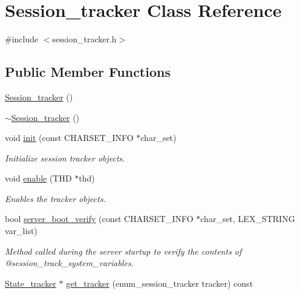 \hypertarget{classSession__tracker}{}\section{Session\+\_\+tracker Class Reference}
\label{classSession__tracker}


{\ttfamily \#include $<$session\+\_\+tracker.\+h$>$}

\subsection*{Public Member Functions}
\begin{DoxyCompactItemize}
\item 
\mbox{\hyperlink{classSession__tracker_a96857c2a4bb6477cdaba666a9cc571a2}{Session\+\_\+tracker}} ()
\item 
\mbox{\hyperlink{classSession__tracker_a1bf5d9cab3063c2a1b28e2535815ad6e}{$\sim$\+Session\+\_\+tracker}} ()
\item 
void \mbox{\hyperlink{classSession__tracker_a9998b3724108bcffd2c2e66c8c497d85}{init}} (const C\+H\+A\+R\+S\+E\+T\+\_\+\+I\+N\+FO $\ast$char\+\_\+set)
\begin{DoxyCompactList}\small\item\em Initialize session tracker objects. \end{DoxyCompactList}\item 
void \mbox{\hyperlink{classSession__tracker_a912c89049fcc0ff1dbe0b06e05e790e8}{enable}} (T\+HD $\ast$thd)
\begin{DoxyCompactList}\small\item\em Enables the tracker objects. \end{DoxyCompactList}\item 
bool \mbox{\hyperlink{classSession__tracker_a8763d1413a6a2a425fc9541fd2098178}{server\+\_\+boot\+\_\+verify}} (const C\+H\+A\+R\+S\+E\+T\+\_\+\+I\+N\+FO $\ast$char\+\_\+set, L\+E\+X\+\_\+\+S\+T\+R\+I\+NG var\+\_\+list)
\begin{DoxyCompactList}\small\item\em Method called during the server startup to verify the contents of @session\+\_\+track\+\_\+system\+\_\+variables. \end{DoxyCompactList}\item 
\mbox{\hyperlink{classState__tracker}{State\+\_\+tracker}} $\ast$ \mbox{\hyperlink{classSession__tracker_a6df3f03511206e6dc60a66ccd7f6e30f}{get\+\_\+tracker}} (enum\+\_\+session\+\_\+tracker tracker) const

\end{DoxyCompactItemize}
